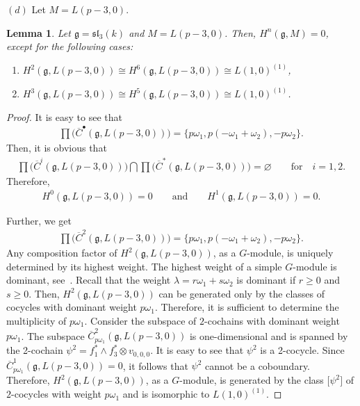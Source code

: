 \documentclass[pdftex]{sigma}%
\numberwithin{equation}{section}
\newtheorem{Lemma}[Theorem]{Lemma}
\begin{document}
$(d)$ Let $M=L(p-3,0)$.

\begin{Lemma}\label{l3}
Let $\mathfrak{g}=\mathfrak{sl}_3(k)$ and $M=L(p-3,0)$. Then, $H^n(\mathfrak{g},M)=0$, except for the following cases:
\begin{enumerate}\itemsep=0pt

\item[$(i)$] $H^2(\mathfrak{g},L(p-3,0))\cong H^6(\mathfrak{g},L(p-3,0))\cong L(1,0)^{(1)}$,

\item[$(ii)$] $H^3(\mathfrak{g},L(p-3,0))\cong H^5(\mathfrak{g},L(p-3,0))\cong L(1,0)^{(1)}$.
\end{enumerate}
\end{Lemma}

\begin{proof}
It is easy to see that
\begin{gather*}
\prod\big(\overline{C}^{\bullet}(\mathfrak{g},L(p-3,0))\big)=
\{p\omega_1, p(-\omega_1+\omega_2), -p\omega_2\}.
\end{gather*}
Then, it is obvious that
\begin{gather*}
\prod\big(\overline{C}^i(\mathfrak{g},L(p-3,0))\big)\bigcap \prod\big(\overline{C}^*(\mathfrak{g},L(p-3,0))\big)=\varnothing
\qquad\text{for}\quad i=1,2.
\end{gather*}
Therefore,
\begin{gather*}
H^0(\mathfrak{g},L(p-3,0))=0\qquad\text{and}\qquad H^1(\mathfrak{g},L(p-3,0))=0.
\end{gather*}

Further, we get
\begin{gather*}
\prod\big(\overline{C}^2(\mathfrak{g},L(p-3,0))\big)=\{p\omega_1, p(-\omega_1+\omega_2), -p\omega_2\}.
\end{gather*}
 Any composition factor of $H^2(\mathfrak{g},L(p-3,0))$, as a $G$-module, is uniquely determined by its highest weight. The highest weight of a simple $G$-module is dominant, see~\cite[p.~260]{Humph80}. Recall that the weight $\lambda=r\omega_1+s\omega_2$ is dominant if $r\geq 0$ and $s\geq 0$. Then, $H^2(\mathfrak{g},L(p-3,0))$ can be generated only by the classes of cocycles with dominant weight $p\omega_1$. Therefore, it is sufficient to determine the multiplicity of $p\omega_1$. Consider the subspace of $2$-cochains with dominant weight~$p\omega_1$. The subspace
$\overline{C}^2_{p\omega_1}(\mathfrak{g},L(p-3,0))$ is one-dimensional and is spanned by the 2-cochain $\psi^2=f_1^*\wedge f_3^*\otimes v_{0,0,0}$. It is easy to see that $\psi^2$ is a 2-cocycle. Since $\overline{C}^1_{p\omega_1}(\mathfrak{g},L(p-3,0))\allowbreak=0$, it follows that $\psi^2$ cannot be a coboundary. Therefore, $H^2(\mathfrak{g},L(p-3,0))$, as a $G$-module, is generated by the class $\big[\psi^2\big]$ of $2$-cocycles with weight $p\omega_1$ and is isomorphic to $L(1,0)^{(1)}$.


\end{proof}
\end{document}
